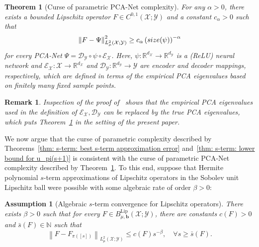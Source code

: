 \documentclass[namedate,webpdf]{ima-authoring-template-blank}
\newcommand*{\Lip}{\mathrm{Lip}}  %
\newcommand*{\nm}[1]{{\left\|#1\right \|}}
\newcounter{counter}
\numberwithin{counter}{section}
\numberwithin{equation}{section}
\theoremstyle{plain}
\newtheorem{theorem}[counter]{Theorem}
\newtheorem{assumption}[counter]{Assumption}
\newtheorem{remark}[counter]{Remark}
\theoremstyle{definition}
\newcommand*{\cD}{\mathcal{D}}
\newcommand*{\cE}{\mathcal{E}}
\newcommand*{\cX}{\mathcal{X}}
\newcommand*{\cY}{\mathcal{Y}}
\newcommand*{\bbN}{\mathbb{N}}
\newcommand*{\bbR}{\mathbb{R}}
\theoremstyle{thmstyletwo}
\begin{document}
\begin{theorem}[Curse of parametric PCA-Net complexity]
\label{thm: curse of parametric complexity; PCA-Net}
    For any \(\alpha > 0\), there exists a bounded Lipschitz operator \(F \in C^{0, 1}(\cX; \cY)\) and a constant \(c_{\alpha} > 0\) such that 
    \[
    \nm{F - \Psi}_{L_{\mu}^2(\cX; \cY)}^2 \geq c_{\alpha} \left(\textup{size}(\psi)\right)^{-\alpha}
    \]
    for every PCA-Net \(\Psi = \cD_{\cY} \circ \psi \circ \cE_{\cX}\). Here, \(\psi: \bbR^{d_{\cX}} \to \bbR^{d_{\cY}}\) is a (ReLU) neural network and \(\cE_{\cX}: \cX \to \bbR^{d_{\cX}}\) and \(\cD_{\cY}: \bbR^{d_{\cY}} \to \cY\) are encoder and decoder mappings, respectively, which are defined in terms of the empirical PCA eigenvalues based on finitely many fixed sample points. 
\end{theorem} 

\begin{remark}
    Inspection of the proof of~\citet[Thm. 9]{lanthaler_OperatorLearningPCANetUpper_2023} shows that the empirical PCA eigenvalues used in the definition of \(\cE_{\cX}, \cD_{\cY}\) can be replaced by the true PCA eigenvalues, which puts Theorem~\ref{thm: curse of parametric complexity; PCA-Net} in the setting of the present paper.
\end{remark}

We now argue that the curse of parametric complexity described by Theorems~\ref{thm: s-term: best s-term approximation error} and~\ref{thm: s-term: lower bound for u_pi(s+1)} is consistent with the curse of parametric PCA-Net complexity described by Theorem~\ref{thm: curse of parametric complexity; PCA-Net}.
To this end, suppose that Hermite polynomial \(s\)-term approximations of Lipschitz operators in the Sobolev unit Lipschitz ball were possible with some algebraic rate of order \(\beta > 0\):

\begin{assumption}[Algebraic \(s\)-term convergence for Lipschitz operators]
\label{ass: Hermite expansion with algebraic rate}
    There exists \(\beta > 0\) such that for every \(F \in B_{\mu, \bm{b}}^{\Lip}(\cX; \cY)\), there are constants \(c(F) > 0\) and \(\bar{s}(F) \in \bbN\) such that 
    \begin{equation}
    \label{eq: Hermite expansion with algebraic rate}
        \nm{F - F_{\pi([s])}}_{L_{\mu}^2(\cX; \cY)} \leq c(F) s^{-\beta}, \quad \forall s \geq \bar{s}(F).
    \end{equation}
\end{assumption}
\end{document}
